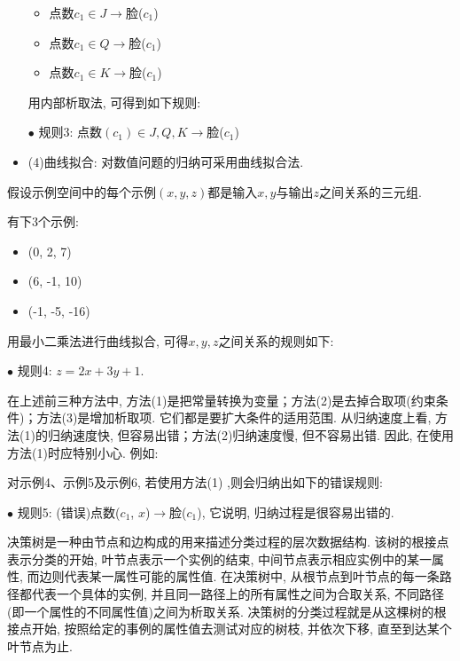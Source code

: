 \begin{itemize}
\begin{itemize}
\item 点数$c_1\in {J}\rightarrow$脸($c_1$)
\item 点数$c_1\in {Q}\rightarrow$脸($c_1$)
\item 点数$c_1\in {K}\rightarrow$脸($c_1$)
\end{itemize}

用内部析取法, 可得到如下规则:

  $\bullet$ 规则3: 点数$(c_1)\in {J, Q, K}\rightarrow$脸($c_1$)

\item (4)曲线拟合: 对数值问题的归纳可采用曲线拟合法.
\end{itemize}
假设示例空间中的每个示例$(x, y, z)$都是输入$x, y$与输出$z$之间关系的三元组.
\begin{example}
有下3个示例:
\begin{itemize}
\item (0, 2, 7)
\item (6, -1, 10)
\item (-1, -5, -16)
\end{itemize}

用最小二乘法进行曲线拟合, 可得$x, y, z$之间关系的规则如下:

$\bullet$ 规则4: $z=2x+3y+1$.
\end{example}
\begin{remark}
在上述前三种方法中, 方法(1)是把常量转换为变量；方法(2)是去掉合取项(约束条件)；方法(3)是增加析取项. 它们都是要扩大条件的适用范围. 从归纳速度上看, 方法(1)的归纳速度快, 但容易出错；方法(2)归纳速度慢, 但不容易出错. 因此, 在使用方法(1)时应特别小心. 例如:

对示例4、示例5及示例6, 若使用方法(1) ,则会归纳出如下的错误规则:

$\bullet$ 规则5: (错误)点数($c_1$, $x$)$\rightarrow$脸($c_1$),
它说明, 归纳过程是很容易出错的.
\end{remark}

决策树是一种由节点和边构成的用来描述分类过程的层次数据结构. 该树的根接点表示分类的开始, 叶节点表示一个实例的结束, 中间节点表示相应实例中的某一属性, 而边则代表某一属性可能的属性值.
在决策树中, 从根节点到叶节点的每一条路径都代表一个具体的实例, 并且同一路径上的所有属性之间为合取关系, 不同路径(即一个属性的不同属性值)之间为析取关系.
决策树的分类过程就是从这棵树的根接点开始, 按照给定的事例的属性值去测试对应的树枝, 并依次下移, 直至到达某个叶节点为止.

